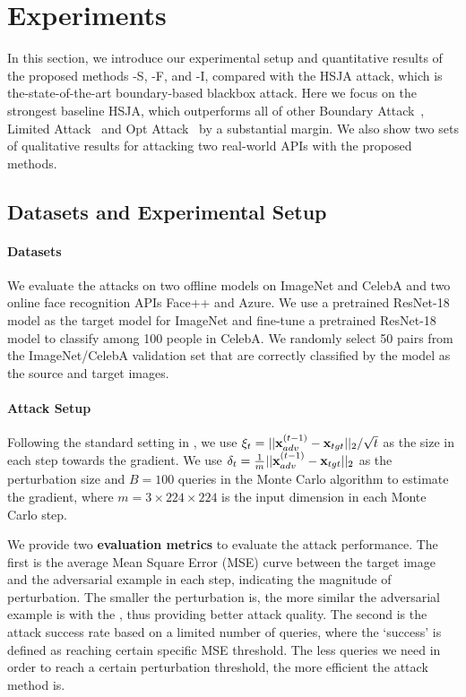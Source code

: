 \section{Experiments}
In this section, we introduce our experimental setup and quantitative results of the proposed methods \name-S, \name-F, and \name-I, compared with the HSJA attack\cite{chen2019hopskipjumpattack}, which is the-state-of-the-art boundary-based blackbox attack.
Here we focus on the strongest baseline HSJA, which outperforms all of other Boundary Attack~\cite{brendel2017decision}, Limited Attack~\cite{ilyas2018black} and Opt Attack~\cite{cheng2018query} by a substantial margin.
We also show two sets of qualitative results for attacking two real-world APIs with the proposed methods.
\subsection{Datasets and Experimental Setup}
\paragraph{Datasets}
We evaluate the attacks on two offline models on ImageNet\cite{deng2009imagenet} and CelebA\cite{liu2018large} and two online face recognition APIs Face++\cite{facepp-compare-api} and Azure\cite{azure-detect-api}. We use a pretrained ResNet-18 model as the target model for ImageNet and fine-tune a pretrained ResNet-18 model to classify among 100 people in CelebA. We randomly select 50 pairs from the ImageNet/CelebA validation set that are correctly classified by the model as the source and target images. 
\paragraph{Attack Setup}
Following the standard setting in \cite{chen2019hopskipjumpattack}, we use $\xi_t=||{\bf x}_{adv}^{(t-1)}-{\bf x}_{tgt}||_2/\sqrt{t}$ as the size in each step towards the gradient. We use $\delta_t=\frac1m ||{\bf x}_{adv}^{(t-1)}-{\bf x}_{tgt}||_2$ as the perturbation size and $B=100$ queries in the Monte Carlo algorithm to estimate the gradient, where $m=3\times224\times224$ is the input dimension in each Monte Carlo step.

We provide two \textbf{evaluation metrics} to evaluate the attack performance. The first is the average Mean Square Error (MSE) curve between the target image and the adversarial example in each step, indicating the magnitude of perturbation. The smaller the perturbation is, the more similar the adversarial example is with the \targetimage, thus providing better attack quality.
The second is the attack success rate based on a limited number of queries, where the `success' is defined as reaching certain specific MSE threshold. The less queries we need in order to reach a certain perturbation threshold, the more efficient the attack method is.

